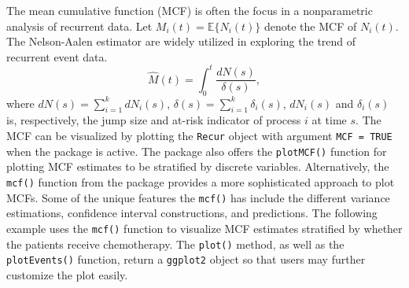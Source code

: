 The mean cumulative function (MCF) is often the focus in a nonparametric
analysis of recurrent data. Let \(M_i(t)=\mathbb{E}\{N_i(t)\}\) denote
the MCF of \(N_i(t)\). The Nelson-Aalen estimator \citep{nelson2003siam}
are widely utilized in exploring the trend of recurrent event data.
\[\hat{M}(t) = \int_0^t \frac{dN(s)}{\delta(s)},\] where
\(dN(s)=\sum_{i=1}^k dN_i(s)\),
\(\delta(s) = \sum_{i=1}^k \delta_i(s)\), \(dN_i(s)\) and
\(\delta_i(s)\) is, respectively, the jump size and at-risk indicator of
process \(i\) at time \(s\). The MCF can be visualized by plotting the
\texttt{Recur} object with argument \texttt{MCF\ =\ TRUE} when the
 package is active. The  package also offers the
\texttt{plotMCF()} function for plotting MCF estimates to be stratified
by discrete variables. Alternatively, the \texttt{mcf()} function from
the  package provides a more sophisticated approach to plot
MCFs. Some of the unique features the \texttt{mcf()} has include the
different variance estimations, confidence interval constructions, and
predictions. The following example uses the \texttt{mcf()} function to
visualize MCF estimates stratified by whether the patients receive
chemotherapy. The \texttt{plot()} method, as well as the
\texttt{plotEvents()} function, return a \texttt{ggplot2} object
\citep{hadley2016ggplot2} so that users may further customize the plot
easily.

\begin{Shaded}
\begin{Highlighting}[]
\StringTok{ } 
 \NormalTok{, } \NormalTok{:}\NormalTok{) +}
\StringTok{    }\NormalTok{(} \NormalTok{)}
\end{Highlighting}
\end{Shaded}


